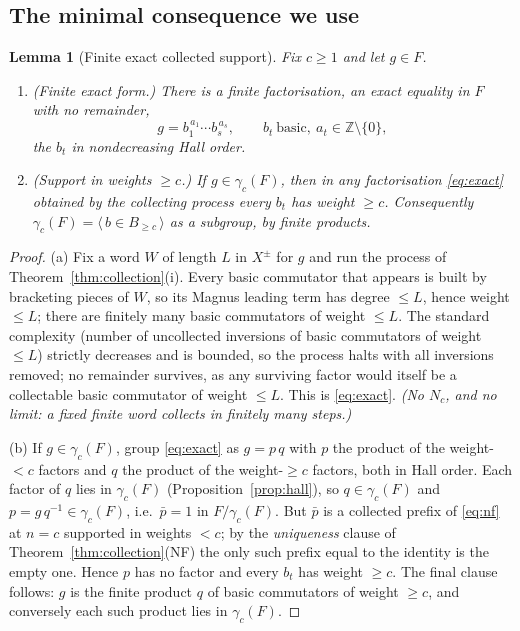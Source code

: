 \documentclass{amsart}
\newtheorem{lemma}{Lemma}
\theoremstyle{definition}
\theoremstyle{remark}
\begin{document}
\subsection*{The minimal consequence we use}

\begin{lemma}[Finite exact collected support]\label{lem:support}
Fix $c\ge1$ and let $g\in F$.
\begin{enumerate}
\item[\textup{(a)}] \textup{(Finite exact form.)} There is a \emph{finite} factorisation, an
\emph{exact} equality in $F$ with no remainder,
\begin{equation}\label{eq:exact}
g=b_{1}^{\,a_1}\cdots b_{s}^{\,a_s},\qquad b_t\ \text{basic},\ a_t\in\mathbb Z\setminus\{0\},
\end{equation}
the $b_t$ in nondecreasing Hall order.
\item[\textup{(b)}] \textup{(Support in weights $\ge c$.)} If $g\in\gamma_c(F)$, then in any
factorisation \eqref{eq:exact} obtained by the collecting process every $b_t$ has weight
$\ge c$. Consequently $\gamma_c(F)=\big\langle\,b\in B_{\ge c}\,\big\rangle$ as a subgroup,
\emph{by finite products}.
\end{enumerate}
\end{lemma}
\begin{proof}
(a) Fix a word $W$ of length $L$ in $X^{\pm}$ for $g$ and run the process of
Theorem~\ref{thm:collection}(i). Every basic commutator that appears is built by bracketing
pieces of $W$, so its Magnus leading term has degree $\le L$, hence weight $\le L$; there are
finitely many basic commutators of weight $\le L$. The standard complexity (number of
uncollected inversions of basic commutators of weight $\le L$) strictly decreases and is
bounded, so the process halts with all inversions removed; no remainder survives, as any
surviving factor would itself be a collectable basic commutator of weight $\le L$. This is
\eqref{eq:exact}. \emph{(No $N_c$, and no limit: a fixed finite word collects in finitely many
steps.)}

(b) If $g\in\gamma_c(F)$, group \eqref{eq:exact} as $g=p\,q$ with $p$ the product of the
weight-$<c$ factors and $q$ the product of the weight-$\ge c$ factors, both in Hall order. Each
factor of $q$ lies in $\gamma_c(F)$ (Proposition~\ref{prop:hall}), so $q\in\gamma_c(F)$ and
$p=g\,q^{-1}\in\gamma_c(F)$, i.e.\ $\bar p=1$ in $F/\gamma_c(F)$. But $\bar p$ is a collected
prefix of \eqref{eq:nf} at $n=c$ supported in weights $<c$; by the \emph{uniqueness} clause of
Theorem~\ref{thm:collection}(NF) the only such prefix equal to the identity is the empty one.
Hence $p$ has no factor and every $b_t$ has weight $\ge c$. The final clause follows: $g$ is the
finite product $q$ of basic commutators of weight $\ge c$, and conversely each such product lies
in $\gamma_c(F)$.
\end{proof}
\end{document}
